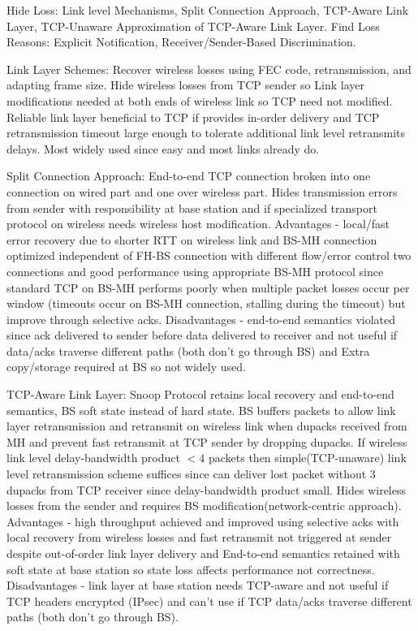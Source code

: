 \documentclass[9pt]{extarticle}
\begin{document}
\begin{multicols}{2}
Hide Loss: Link level Mechanisms, Split Connection Approach, TCP-Aware Link Layer, TCP-Unaware Approximation of TCP-Aware Link Layer. Find Loss Reasons: Explicit Notification, Receiver/Sender-Based Discrimination.

Link Layer Schemes: Recover wireless losses using FEC code, retransmission, and adapting frame size. Hide wireless losses from TCP sender so Link layer modifications needed at both ends of wireless link so TCP need not modified. Reliable link layer beneficial to TCP if provides in-order delivery and TCP retransmission timeout large enough to tolerate additional link level retransmits delays. Most widely used since easy and most links already do.

Split Connection Approach: End-to-end TCP connection broken into one connection on wired part and one over wireless part. Hides transmission errors from sender with responsibility at base station and if specialized transport protocol on wireless needs wireless host modification.  Advantages - local/fast error recovery due to shorter RTT on wireless link and  BS-MH connection optimized independent of FH-BS connection with different flow/error control two connections and good performance using appropriate BS-MH protocol since standard TCP on BS-MH performs poorly when multiple packet losses occur per window (timeouts occur on BS-MH connection, stalling during the timeout) but improve through selective acks. Disadvantages - end-to-end semantics violated since ack delivered to sender before data delivered to receiver and not useful if data/acks traverse different paths (both don't go through BS) and Extra copy/storage required at BS so not widely used.

TCP-Aware Link Layer: Snoop Protocol retains local recovery and end-to-end semantics, BS soft state instead of hard state. BS buffers packets to allow link layer retransmission and retransmit on wireless link when dupacks received from MH and prevent fast retransmit at TCP sender by dropping dupacks. If wireless link level delay-bandwidth product $<4$ packets then simple(TCP-unaware) link level retransmission scheme suffices since can deliver lost packet without 3 dupacks from TCP receiver since delay-bandwidth product small. Hides wireless losses from the sender and requires BS modification(network-centric approach). Advantages - high throughput achieved and improved using selective acks with local recovery from wireless losses and fast retransmit not triggered at sender despite out-of-order link layer delivery and End-to-end semantics retained with soft state at base station so state loss affects performance not correctness. Disadvantages - link layer at base station needs TCP-aware and not useful if TCP headers encrypted (IPsec) and can't use if TCP data/acks traverse different paths (both don't go through BS).


\end{multicols}
\end{document}
